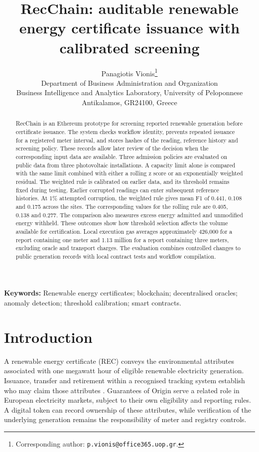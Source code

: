 \documentclass[11pt,a4paper]{article}
\title{RecChain: auditable renewable energy certificate issuance with calibrated screening}
\author{Panagiotis Vionis\thanks{Corresponding author: \texttt{p.vionis@office365.uop.gr}.}\\[5pt]
\small Department of Business Administration and Organization\\
\small Business Intelligence and Analytics Laboratory, University of Peloponnese\\
\small Antikalamos, GR24100, Greece}
\date{}
\begin{document}
\maketitle
\begin{abstract}
RecChain is an Ethereum prototype for screening reported renewable generation before certificate issuance. The system checks workflow identity, prevents repeated issuance for a registered meter interval, and stores hashes of the reading, reference history and screening policy. These records allow later review of the decision when the corresponding input data are available. Three admission policies are evaluated on public data from three photovoltaic installations. A capacity limit alone is compared with the same limit combined with either a rolling z score or an exponentially weighted residual. The weighted rule is calibrated on earlier data, and its threshold remains fixed during testing. Earlier corrupted readings can enter subsequent reference histories. At 1\% attempted corruption, the weighted rule gives mean F1 of 0.441, 0.108 and 0.175 across the sites. The corresponding values for the rolling rule are 0.405, 0.138 and 0.277. The comparison also measures excess energy admitted and unmodified energy withheld. These outcomes show how threshold selection affects the volume available for certification. Local execution gas averages approximately 426,000 for a report containing one meter and 1.13 million for a report containing three meters, excluding oracle and transport charges. The evaluation combines controlled changes to public generation records with local contract tests and workflow compilation.
\end{abstract}
\noindent\textbf{Keywords:} Renewable energy certificates; blockchain; decentralised oracles; anomaly detection; threshold calibration; smart contracts.


\section{Introduction}
A renewable energy certificate (REC) conveys the environmental attributes associated with one megawatt hour of eligible renewable electricity generation. Issuance, transfer and retirement within a recognised tracking system establish who may claim those attributes \cite{epa}. Guarantees of Origin serve a related role in European electricity markets, subject to their own eligibility and reporting rules. A digital token can record ownership of these attributes, while verification of the underlying generation remains the responsibility of meter and registry controls.
\end{document}
